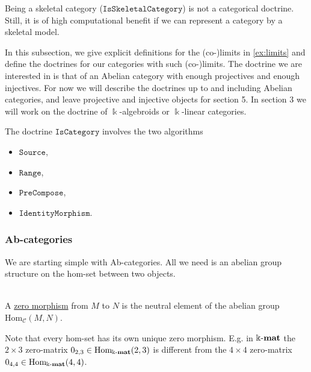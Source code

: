 Being a skeletal category ($\mathtt{IsSkeletalCategory}$) is not a categorical doctrine. Still, it is of high computational benefit
if we can represent a category by a skeletal model.

In this subsection, we give explicit definitions for the (co-)limits in \ref{ex:limits} and define the
doctrines for our categories with such (co-)limits. The doctrine we are interested in is that of an Abelian category with
enough projectives and enough injectives. For now we will describe the doctrines up to and including Abelian categories, and
leave projective and injective objects for section 5. In section 3 we will work on the doctrine of $\Bbbk$-algebroids or $\Bbbk$-linear
categories.

\begin{doctrine}[Category]\label{doc:category}
The doctrine $\mathtt{IsCategory}$ involves the two algorithms
\begin{itemize}
\item $\mathtt{Source}$,
\item $\mathtt{Range}$,
\item $\mathtt{PreCompose}$,
\item $\mathtt{IdentityMorphism}$.
\end{itemize}
\end{doctrine}


\subsubsection{Ab-categories}
We are starting simple with Ab-categories. All we need is an abelian group structure on the hom-set between two objects.

\begin{definition}\label{def:zero_morphism}\phantom{}\\
A \ul{zero morphism} from $M$ to $N$ is the neutral element of the abelian group $\mathrm{Hom}_{\mathcal{C}}(M,N)$.
\end{definition}
Note that every hom-set has its own unique zero morphism. E.g. in $\Bbbk\textnormal{-}\mathbf{mat}$ the $2 \times 3$ zero-matrix
$0_{2,3} \in \textup{Hom}_{\Bbbk\textnormal{-}\mathbf{mat}}(2,3)$ is different from the $4 \times 4$ zero-matrix $0_{4,4} \in \textup{Hom}_{\Bbbk\textnormal{-}\mathbf{mat}}(4,4)$.


